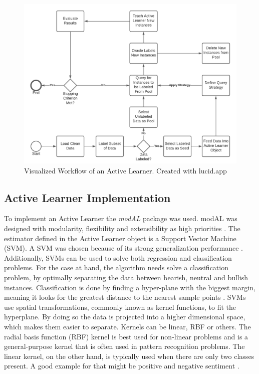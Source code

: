 \documentclass[11pt, a4paper]{article}
\begin{document}
\begin{figure}
    \centering
    \includegraphics[width=\textwidth]{al_workflow.png}
    \caption{Visualized Workflow of an Active Learner. Created with lucid.app}
    \label{fig:AL_Workflow}
\end{figure}

\subsection{Active Learner Implementation} \label{subs:activelearnerimplementation}
To implement an Active Learner the \emph{modAL} package was used. modAL was designed with modularity, flexibility and extensibility as high priorities \citep{danka2018modal}. 
The estimator defined in the Active Learner object is a Support Vector Machine (SVM). A SVM was chosen because of its strong generalization 
performance \citep{alves2014comparisonsvm}.
Additionally, SVMs can be used to solve both regression and 
classification problems. For the case at hand, the algorithm needs solve a classification problem, by optimally separating the data between bearish, 
neutral and bullish instances. Classification is done by finding a hyper-plane with the biggest margin, meaning it looks for the greatest distance 
to the nearest sample points \citep{jemai2021SentimentAnalysis}. SVMs use spatial transformations, commonly known as kernel functions, to fit the hyperplane.
By doing so the data is projected into a higher dimensional space, which makes them easier to separate.
Kernels can be linear, RBF or others. The radial basis function (RBF) kernel is best used for non-linear problems and is a general-purpose kernel that 
is often used in pattern recognition problems. The linear kernel, on the other hand, is typically used when there are only two classes present. 
A good example for that might be positive and negative sentiment \citep{alves2014comparisonsvm}.
\end{document}

